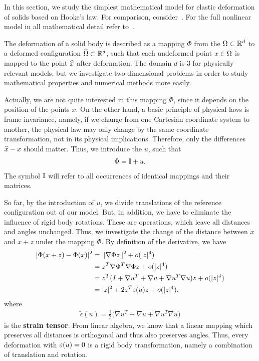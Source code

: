 In this section, we study the simplest mathematical model for elastic
deformation of solids based on Hooke's law. For comparison,
consider~\cite{Braess97,Braess13}. For the full nonlinear model in all
mathematical detail refer to~\cite{Ciarlet88}.

\begin{intro}
  The deformation of a solid body is described as a mapping $\Phi$
  from the  $\Omega\subset \mathbb R^d$ to a
  deformed configuration $\widehat{\Omega} \subset \mathbb R^d$, such that
  each undeformed point $x\in\Omega$ is mapped to the point
  $\widehat{x}$ after deformation. The domain $d$ is 3 for physically
  relevant models, but we investigate two-dimensional problems in
  order to study mathematical properties and numerical methods more
  easily.

  Actually, we are not quite interested in this mapping $\Phi$, since
  it depends on the position of the points $x$. On the other hand, a
  basic principle of physical laws is frame invariance, namely, if we
  change from one Cartesian coordinate system to another, the physical
  law may only change by the same coordinate transformation, not in
  its physical implications. Therefore, only the differences
  $\widehat{x}-x$ should matter. Thus, we introduce the
   $u$, such that
  \begin{gather}
    \Phi = \mathbb I + u.
  \end{gather}
  The symbol $\mathbb I$ will refer to all occurrences of identical mappings
  and their matrices.

  So far, by the introduction of $u$, we divide translations of the
  reference configuration out of our model. But, in addition, we have
  to eliminate the influence of rigid body rotations. These are
  operations, which leave all distances and angles unchanged. Thus, we
  investigate the change of the distance between $x$ and $x+z$ under
  the mapping $\Phi$. By definition of the derivative, we have
  \begin{align}
    \lvert\Phi(x+z) - \Phi(x)\rvert^2 &= \lVert\nabla\Phi z\rVert^2 + o(\lvert z\rvert^4)
    \\
                              &= z^T\nabla\Phi^T\nabla\Phi z + o(\lvert z\rvert^4)
    \\
    &= z^T(I + \nabla u^T + \nabla u + \nabla u^T \nabla u) z + o(\lvert z\rvert^4)
    \\
    &= \lvert z\rvert^2 + 2 z^T\varepsilon(u) z + o(\lvert z\rvert^4),
  \end{align}
  where
  \begin{gather}
    \tilde\epsilon(u) = \tfrac12
    \bigl(\nabla u^T + \nabla u + \nabla u^T \nabla u\bigr)
  \end{gather}
  is the \textbf{strain tensor}. From linear algebra, we know that a
  linear mapping which preserves all distances is orthogonal and thus
  also preserves angles. Thus, every deformation with $\varepsilon(u)=0$
  is a rigid body transformation, namely a combination of translation
  and rotation.


\end{intro}
